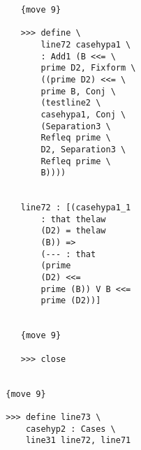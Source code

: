 \documentclass[12pt]{article}
\begin{document}
\begin{verbatim}
                              {move 9}

                              >>> define \
                                  line72 casehypa1 \
                                  : Add1 (B <<= \
                                  prime D2, Fixform \
                                  ((prime D2) <<= \
                                  prime B, Conj \
                                  (testline2 \
                                  casehypa1, Conj \
                                  (Separation3 \
                                  Refleq prime \
                                  D2, Separation3 \
                                  Refleq prime \
                                  B))))


                              line72 : [(casehypa1_1 
                                  : that thelaw 
                                  (D2) = thelaw 
                                  (B)) => 
                                  (--- : that 
                                  (prime 
                                  (D2) <<= 
                                  prime (B)) V B <<= 
                                  prime (D2))]


                              {move 9}

                              >>> close


                           {move 9}

                           >>> define line73 \
                               casehyp2 : Cases \
                               line31 line72, line71



\end{verbatim}
\end{document}
